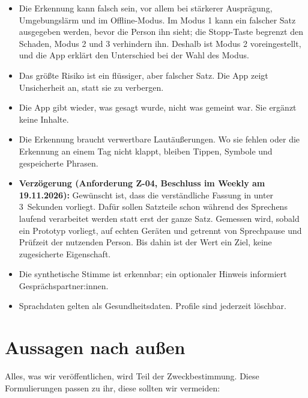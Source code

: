 \documentclass[a4paper]{article}
\begin{document}
\begin{itemize}
\item Die Erkennung kann falsch sein, vor allem bei stärkerer Ausprägung, Umgebungslärm und im Offline-Modus. Im Modus 1 kann ein falscher Satz ausgegeben werden, bevor die Person ihn sieht; die Stopp-Taste begrenzt den Schaden, Modus 2 und 3 verhindern ihn. Deshalb ist Modus 2 voreingestellt, und die App erklärt den Unterschied bei der Wahl des Modus.
\item Das größte Risiko ist ein flüssiger, aber falscher Satz. Die App zeigt Unsicherheit an, statt sie zu verbergen.
\item Die App gibt wieder, was gesagt wurde, nicht was gemeint war. Sie ergänzt keine Inhalte.
\item Die Erkennung braucht verwertbare Lautäußerungen. Wo sie fehlen oder die Erkennung an einem Tag nicht klappt, bleiben Tippen, Symbole und gespeicherte Phrasen.
\item \textbf{Verzögerung (Anforderung Z-04, Beschluss im Weekly am 19.11.2026):} Gewünscht ist, dass die verständliche Fassung in unter 3~Sekunden vorliegt. Dafür sollen Satzteile schon während des Sprechens laufend verarbeitet werden statt erst der ganze Satz. Gemessen wird, sobald ein Prototyp vorliegt, auf echten Geräten und getrennt von Sprechpause und Prüfzeit der nutzenden Person. Bis dahin ist der Wert ein Ziel, keine zugesicherte Eigenschaft.
\item Die synthetische Stimme ist erkennbar; ein optionaler Hinweis informiert Gesprächspartner:innen.
\item Sprachdaten gelten als Gesundheitsdaten. Profile sind jederzeit löschbar.
\end{itemize}

\section{Aussagen nach außen}

Alles, was wir veröffentlichen, wird Teil der Zweckbestimmung. Diese Formulierungen passen zu ihr, diese sollten wir vermeiden:
\end{document}
